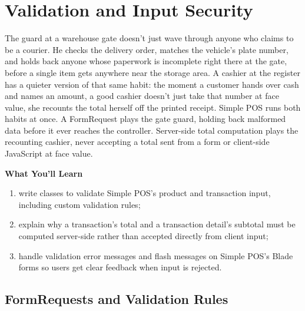 
\chapter{Validation and Input Security}
\label{ch:validasi-input}


The guard at a warehouse gate doesn't just wave through anyone who
claims to be a courier. He checks the delivery order, matches the
vehicle's plate number, and holds back anyone whose paperwork is
incomplete right there at the gate, before a single item gets anywhere
near the storage area. A cashier at the register has a quieter version
of that same habit: the moment a customer hands over cash and names an
amount, a good cashier doesn't just take that number at face value, she
recounts the total herself off the printed receipt. Simple POS runs
both habits at once. A FormRequest plays the gate guard, holding back
malformed data before it ever reaches the controller. Server-side total
computation plays the recounting cashier, never accepting a total sent
from a form or client-side JavaScript at face value.

\textbf{What You'll Learn}

\begin{enumerate}
  \item write  classes to validate Simple POS's product and transaction input, including custom validation rules;
  \item explain why a transaction's total and a transaction detail's subtotal must be computed server-side rather than accepted directly from client input;
  \item handle validation error messages and flash messages on Simple POS's Blade forms so users get clear feedback when input is rejected.
\end{enumerate}

\section{FormRequests and Validation Rules}
\label{sec:validasi-input-1}

